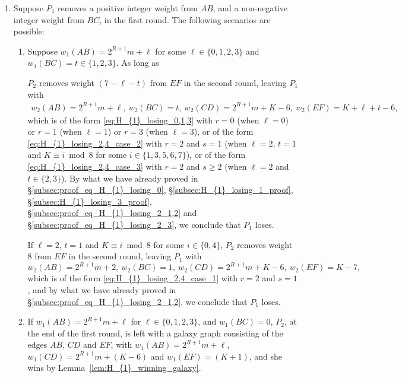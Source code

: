 \documentclass[11pt,reqno]{amsart}
\theoremstyle{definition}
\theoremstyle{definition}
\begin{document}
\begin{enumerate}
\item Suppose $P_{1}$ removes a positive integer weight from $AB$, and a non-negative integer weight from $BC$, in the first round. The following scenarios are possible:
\begin{enumerate}
\item Suppose $w_{1}(AB)=2^{R+1}m+\ell$ for some $\ell \in \{0,1,2,3\}$ and $w_{1}(BC)=t\in\{1,2,3\}$. As long as
$P_{2}$ removes weight $(7-\ell-t)$ from $EF$ in the second round, leaving $P_{1}$ with
\begin{align}
w_{2}(AB)=2^{R+1}m+\ell,\ w_{2}(BC)=t,\ w_{2}(CD)=2^{R+1}m+K-6,\ w_{2}(EF)=K+\ell+t-6,\nonumber
\end{align}
which is of the form \eqref{eq:H_{1}_losing_0,1,3} with $r=0$ (when $\ell=0$) or $r=1$ (when $\ell=1$) or $r=3$ (when $\ell=3$), or of the form \eqref{eq:H_{1}_losing_2,4_case_2} with $r=2$ and $s=1$ (when $\ell=2$, $t=1$ and $K \equiv i \bmod 8$ for some $i \in \{1,3,5,6,7\}$), or of the form \eqref{eq:H_{1}_losing_2,4_case_3} with $r=2$ and $s\geqslant 2$ (when $\ell=2$ and $t\in\{2,3\}$). By what we have already proved in \S\ref{subsec:proof_eq_H_{1}_losing_0}, \S\ref{subsec:H_{1}_losing_1_proof}, \S\ref{subsec:H_{1}_losing_3_proof}, \S\ref{subsec:proof_eq_H_{1}_losing_2_1,2} and \S\ref{subsec:proof_eq_H_{1}_losing_2_3}, we conclude that $P_{1}$ loses. 

If $\ell=2$, $t=1$ and $K \equiv i \bmod 8$ for some $i \in\{0,4\}$, $P_{2}$ removes weight $8$ from $EF$ in the second round, leaving $P_{1}$ with
\begin{equation}
w_{2}(AB)=2^{R+1}m+2,\ w_{2}(BC)=1,\ w_{2}(CD)=2^{R+1}m+K-6,\ w_{2}(EF)=K-7,\nonumber
\end{equation}
which is of the form \eqref{eq:H_{1}_losing_2,4_case_1} with $r=2$ and $s=1$, and by what we have already proved in \S\ref{subsec:proof_eq_H_{1}_losing_2_1,2}, we conclude that $P_{1}$ loses. 

\item If $w_{1}(AB)=2^{R+1}m+\ell$ for $\ell\in\{0,1,2,3\}$, and $w_{1}(BC)=0$, $P_{2}$, at the end of the first round, is left with a galaxy graph consisting of the edges $AB$, $CD$ and $EF$, with $w_{1}(AB)=2^{R+1}m+\ell$, $w_{1}(CD)=2^{R+1}m+(K-6)$ and $w_{1}(EF)=(K+1)$, and she wins by Lemma~\ref{lem:H_{1}_winning_galaxy}.


\end{enumerate}
\end{enumerate}
\end{document}
